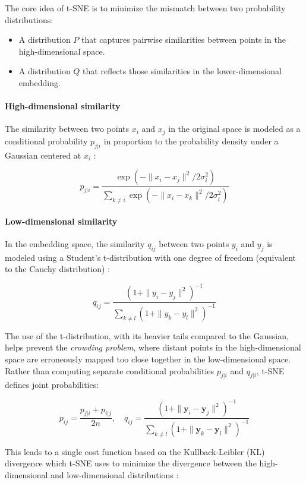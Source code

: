\documentclass[conference]{IEEEtran}
\begin{document}
The core idea of t-SNE is to minimize the mismatch between two probability distributions:
\begin{itemize}
    \item A distribution \( P \) that captures pairwise similarities between points in the high-dimensional space.
    \item A distribution \( Q \) that reflects those similarities in the lower-dimensional embedding.
\end{itemize} 
\vspace{0.5em}
\paragraph{High-dimensional similarity} The similarity between two points \( x_i \) and \( x_j \) in the original space is modeled as a conditional probability \( p_{j|i} \) in proportion to the probability density under a Gaussian centered at \( x_i \) \cite{tsne}:

\[
p_{j|i} = \frac{\exp(-\|x_i - x_j\|^2 / 2\sigma_i^2)}{\sum_{k \neq i} \exp(-\|x_i - x_k\|^2 / 2\sigma_i^2)}
\]

\paragraph{Low-dimensional similarity} In the embedding space, the similarity \( q_{ij} \) between two points \( y_i \) and \( y_j \) is modeled using a Student's t-distribution with one degree of freedom (equivalent to the Cauchy distribution) \cite{tsne}:

\[
q_{ij} = \frac{(1 + \|y_i - y_j\|^2)^{-1}}{\sum_{k \neq l} (1 + \|y_k - y_l\|^2)^{-1}}
\]

The use of the t-distribution, with its heavier tails compared to the Gaussian, helps prevent the \textit{crowding problem}, where distant points in the high-dimensional space are erroneously mapped too close together in the low-dimensional space. \\

Rather than computing separate conditional probabilities \( p_{j|i} \) and \( q_{j|i} \), t-SNE defines joint probabilities:

\[
p_{ij} = \frac{p_{j|i} + p_{i|j}}{2n}, \quad q_{ij} = \frac{(1 + \|\mathbf{y}_i - \mathbf{y}_j\|^2)^{-1}}{\sum_{k \neq l} (1 + \|\mathbf{y}_k - \mathbf{y}_l\|^2)^{-1}}
\]

This leads to a single cost function based on the Kullback-Leibler (KL) divergence which t-SNE uses to minimize the divergence between the high-dimensional and low-dimensional distributions \cite{tsne}:
\end{document}
